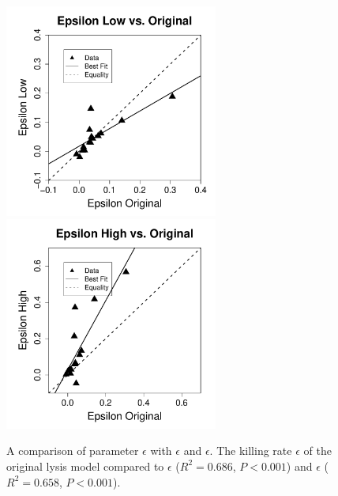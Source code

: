 \begin{figure}[htp]
\centering
\includegraphics[width=7cm]{./Figures/chapter5/figureLowOrig}%
\hspace{0cm}%
\includegraphics[width=7cm]{./Figures/chapter5/figureHighOrig} \\
\caption[A comparison of parameter $\epsilon$ with $\epsilon$ and $\epsilon$]{A comparison of parameter $\epsilon$ with $\epsilon$ and $\epsilon$. The killing rate $\epsilon$ of the original lysis model  compared to $\epsilon$ ($R^2 = 0.686$, $P < 0.001$) and $\epsilon$ ($R^2 = 0.658$, $P < 0.001$).}
\label{appendixb/figure2}
\end{figure}

